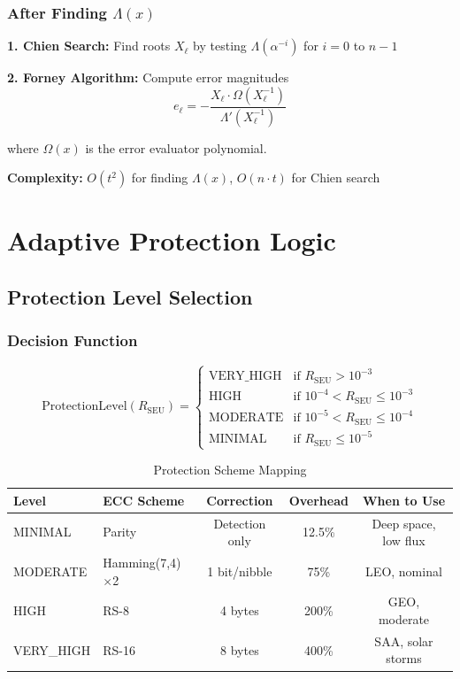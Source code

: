 \documentclass[11pt,a4paper]{article}
\begin{document}
\subsubsection{After Finding $\Lambda(x)$}

\textbf{1. Chien Search:} Find roots $X_\ell$ by testing $\Lambda(\alpha^{-i})$ for $i=0$ to $n-1$

\textbf{2. Forney Algorithm:} Compute error magnitudes
\begin{equation}
e_\ell = -\frac{X_\ell \cdot \Omega(X_\ell^{-1})}{\Lambda'(X_\ell^{-1})}
\end{equation}

where $\Omega(x)$ is the error evaluator polynomial.

\textbf{Complexity:} $O(t^2)$ for finding $\Lambda(x)$, $O(n \cdot t)$ for Chien search

\newpage
\section{Adaptive Protection Logic}

\subsection{Protection Level Selection}

\subsubsection{Decision Function}

\begin{equation}
\text{ProtectionLevel}(R_{\text{SEU}}) = \begin{cases}
\text{VERY\_HIGH} & \text{if } R_{\text{SEU}} > 10^{-3} \\
\text{HIGH} & \text{if } 10^{-4} < R_{\text{SEU}} \leq 10^{-3} \\
\text{MODERATE} & \text{if } 10^{-5} < R_{\text{SEU}} \leq 10^{-4} \\
\text{MINIMAL} & \text{if } R_{\text{SEU}} \leq 10^{-5}
\end{cases}
\end{equation}

\begin{table}[htbp]
\centering
\caption{Protection Scheme Mapping}
\begin{tabular}{@{}llccc@{}}
\toprule
\textbf{Level} & \textbf{ECC Scheme} & \textbf{Correction} & \textbf{Overhead} & \textbf{When to Use} \\ \midrule
MINIMAL & Parity & Detection only & 12.5\% & Deep space, low flux \\
MODERATE & Hamming(7,4)$\times$2 & 1 bit/nibble & 75\% & LEO, nominal \\
HIGH & RS-8 & 4 bytes & 200\% & GEO, moderate \\
VERY\_HIGH & RS-16 & 8 bytes & 400\% & SAA, solar storms \\ \bottomrule
\end{tabular}
\end{table}
\end{document}
